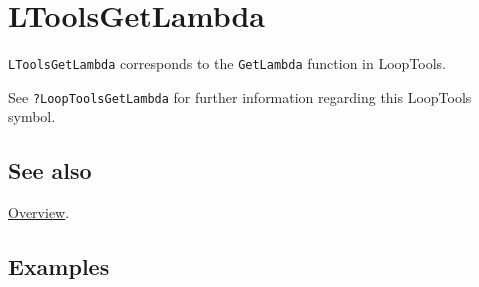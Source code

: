 \documentclass[../FeynHelpersManual.tex]{subfiles}
\begin{document}
\hypertarget{ltoolsgetlambda}{
\section{LToolsGetLambda}\label{ltoolsgetlambda}}

\texttt{LToolsGetLambda} corresponds to the \texttt{GetLambda} function
in LoopTools.

See \texttt{?LoopTools\textasciigrave GetLambda} for further information
regarding this LoopTools symbol.

\subsection{See also}

\hyperlink{toc}{Overview}.

\subsection{Examples}
\end{document}
